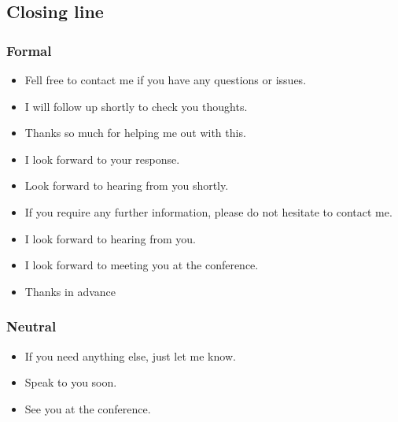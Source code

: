 \subsection{Closing line}

\subsubsection{Formal}
\begin{itemize}
\item Fell free to contact me if you have any questions or issues.
\item I will follow up shortly to check you thoughts.
\item Thanks so much for helping me out with this.
\item I look forward to your response.
\item Look forward to hearing from you shortly.
\item If you require any further information, please do not hesitate to contact me.
\item I look forward to hearing from you.
\item I look forward to meeting you at the conference.
\item Thanks in advance
\end{itemize}

\subsubsection{Neutral}
\begin{itemize}
\item If you need anything else, just let me know.
\item Speak to you soon.
\item See you at the conference.
\end{itemize}